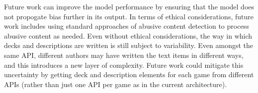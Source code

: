 \documentclass[10pt,twocolumn]{article}
\begin{document}
\begin{comment}
     moderate or standardize the descriptions used as input to the SVM. 
     
     Consider this:
     Descriptions may be written by different authors even if they come from the same API, and this potentially introduces variability. I plan to address this in my paper as an extension for future work and consider some potential ways to handle it (perhaps collecting descriptions for one game from various APIs as an improvement). 

    Future work can involve training the model beyond word embeddings so that it can capture similar qualitative aspects of the game. (this improves recall)
    
    So, future work can include using NLP approaches like sentiment analysis, dependency parsing, etc. in order to further pinpoint game relatedness

    Dependency parsing - An Intelligent Data Analysis for Recommendation Systems Using Machine Learning

    improve conventional collaborative filtering approach by using sentiment analysis on hotel reviews for feature extraction (polarity identification using syntax and semantic analysis), evaluated w/ precision, recall, and F-1

    https://www.hindawi.com/journals/sp/2019/5941096/ - cited

    Sentiment analysis - https://www.sciencedirect.com/science/article/abs/pii/S0920548912001237 - cited

    Sentiment analysis algorithm that examines syntax-level relationships between words (via dependency parsing) in order to provide context for restaurant reviews


    Future work if more time was involved could include scraping review content from average players (from forums, Google reviews, etc.)

    Conclusion:

    
    
\end{comment}

Future work can improve the model performance by ensuring that the model does not propogate bias further in its output. In terms of ethical considerations, future work includes using standard approaches of abusive content detection \cite{Mathew} to process abusive content as needed. Even without ethical considerations, the way in which decks and descriptions are written is still subject to variability. Even amongst the same API, different authors may have written the text items in different ways, and this introduces a new layer of complexity. Future work could mitigate this uncertainty by getting deck and description elements for each game from different APIs (rather than just one API per game as in the current architecture). 
\end{document}
